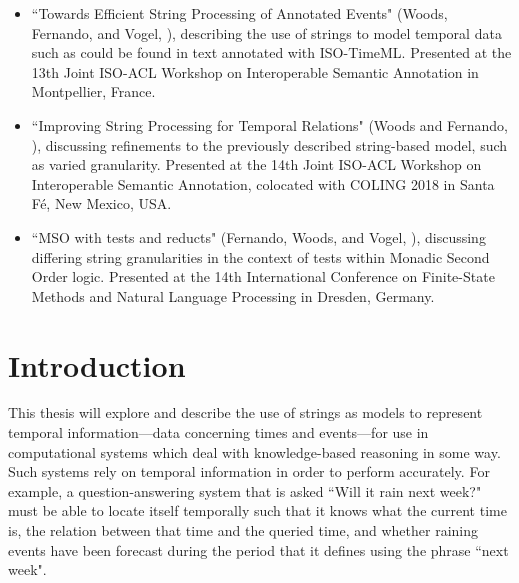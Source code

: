 \documentclass[a4paper,12pt,leqno]{article}
\begin{document}
\begin{itemize}
	\item ``Towards Efficient String Processing of Annotated Events" (Woods, Fernando, and Vogel, \citeyear{woods2017towards}), describing the use of strings to model temporal data such as could be found in text annotated with ISO-TimeML. Presented at the 13th Joint ISO-ACL Workshop on Interoperable Semantic Annotation in Montpellier, France.
	\item ``Improving String Processing for Temporal Relations" (Woods and Fernando, \citeyear{woods2018improving}), discussing refinements to the previously described string-based model, such as varied granularity. Presented at the 14th Joint ISO-ACL Workshop on Interoperable Semantic Annotation, colocated with COLING 2018 in Santa F\'{e}, New Mexico, USA.
	\item ``MSO with tests and reducts" (Fernando, Woods, and Vogel, \citeyear{fernando2019mso}), discussing differing string granularities in the context of tests within Monadic Second Order logic. Presented at the 14th International Conference on Finite-State Methods and Natural Language Processing in Dresden, Germany.
\end{itemize}
\newpage
{}
\tableofcontents
\newpage
\listoftables
\newpage
{}
\section{Introduction}\label{sec:intro}
This thesis will explore and describe the use of strings as models to represent temporal information---data concerning times and events---for use in computational systems which deal with knowledge-based reasoning in some way. Such systems rely on temporal information in order to perform accurately. For example, a question-answering system that is asked ``Will it rain next week?" must be able to locate itself temporally such that it knows what the current time is, the relation between that time and the queried time, and whether raining events have been forecast during the period that it defines using the phrase ``next week".
\newpage
\end{document}
